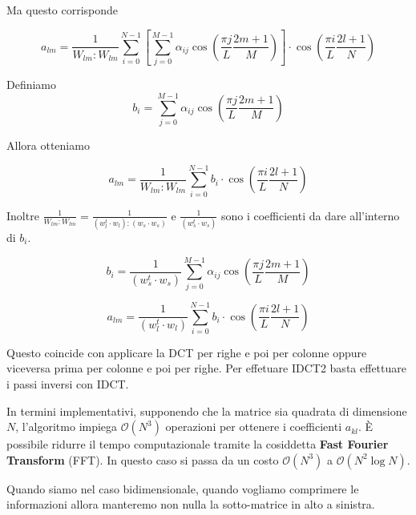 Ma questo corrisponde 

\begin{equation*}
    a_{lm} = \frac{1}{W_{lm}:W_{lm}} \sum_{i=0}^{N-1}\left[\sum_{j=0}^{M-1} \alpha_{ij} \cos \left(\frac{\pi j}{L}\frac{2m+1}{M}\right)\right]\cdot \cos \left(\frac{\pi i}{L}\frac{2l+1}{N}\right)    
\end{equation*}

Definiamo 
\begin{equation*}
    b_i = \sum_{j=0}^{M-1} \alpha_{ij} \cos \left(\frac{\pi j}{L}\frac{2m+1}{M}\right)
\end{equation*}

Allora otteniamo 

\begin{equation*}
    a_{lm} = \frac{1}{W_{lm}:W_{lm}} \sum_{i=0}^{N-1}b_i\cdot \cos \left(\frac{\pi i}{L}\frac{2l+1}{N}\right)    
\end{equation*}

Inoltre $\frac{1}{W_{lm}:W_{lm}}  = \frac{1}{(w_{l}^t\cdot w_l):(w_{s}\cdot w_s)}$
e $\frac{1}{(w_{s}^t\cdot w_s)}$ sono i coefficienti da dare all'interno di $b_i$.

\begin{equation*}
    b_i = \frac{1}{(w_{s}^t\cdot w_s)} \sum_{j=0}^{M-1} \alpha_{ij} \cos \left(\frac{\pi j}{L}\frac{2m+1}{M}\right)
\end{equation*}

\begin{equation*}
    a_{lm} = \frac{1}{(w_{l}^t\cdot w_l)} \sum_{i=0}^{N-1}b_i\cdot \cos \left(\frac{\pi i}{L}\frac{2l+1}{N}\right)    
\end{equation*}

Questo coincide con applicare la DCT per righe e poi per colonne oppure viceversa 
prima per colonne e poi per righe. Per effetuare IDCT2 basta effettuare i passi inversi 
con IDCT.

In termini implementativi, supponendo che la matrice sia quadrata di dimensione
$N$, l'algoritmo impiega $\mathcal{O}(N^3)$ operazioni per ottenere i coefficienti
$a_{kl}$. È possibile ridurre il tempo computazionale tramite la cosiddetta
\textbf{Fast Fourier Transform} (FFT). In questo caso si passa da un costo
$\mathcal{O}(N^3)$ a $\mathcal{O}(N^2 \log N)$.

\begin{nota}
    Quando siamo nel caso bidimensionale, quando vogliamo comprimere le informazioni
    allora manteremo non nulla la sotto-matrice in alto a sinistra. 
\end{nota}